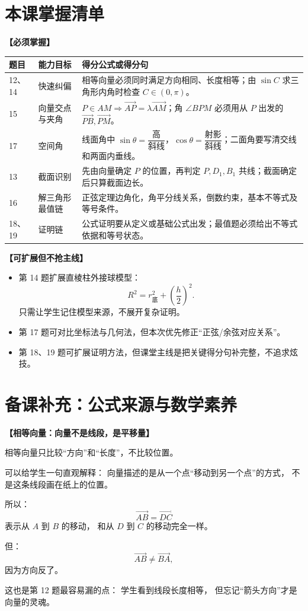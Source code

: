 \documentclass[11pt,a4paper]{ctexart}
\begin{document}
\section{本课掌握清单}

\textbf{【必须掌握】}\par
\begingroup
\small
\begin{tabularx}{\textwidth}{p{2.2cm}p{3.2cm}X}
\toprule
题目 & 能力目标 & 得分公式或得分句 \\
\midrule
12、14 & 快速纠偏 & 相等向量必须同时满足方向相同、长度相等；由 \(\sin C\) 求三角形内角时检查 \(C\in(0,\pi)\)。\\
15 & 向量交点与夹角 & \(P\in AM\Rightarrow \vec{AP}=\lambda\vec{AM}\)；角 \(\angle BPM\) 必须用从 \(P\) 出发的 \(\vec{PB},\vec{PM}\)。\\
17 & 空间角 & 线面角中 \(\sin\theta=\dfrac{\text{高}}{\text{斜线}}\)，\(\cos\theta=\dfrac{\text{射影}}{\text{斜线}}\)；二面角要写清交线和两面内垂线。\\
13 & 截面识别 & 先由向量确定 \(P\) 的位置，再判定 \(P,D_1,B_1\) 共线；截面确定后只算截面边长。\\
16 & 解三角形最值链 & 正弦定理边角化，角平分线关系，倒数约束，基本不等式及等号条件。\\
18、19 & 证明链 & 公式证明要从定义或基础公式出发；最值题必须给出不等式依据和等号状态。\\
\bottomrule
\end{tabularx}
\endgroup

\vspace{0.6em}
\textbf{【可扩展但不抢主线】}\par
\begin{itemize}[label=\(\circ\), leftmargin=1.5em, itemsep=0.2em]
  \item 第 14 题扩展直棱柱外接球模型：
  \[
    R^2=r_{\text{底}}^2+\left(\frac{h}{2}\right)^2.
  \]
  只需让学生记住模型来源，不展开复杂证明。
  \item 第 17 题可对比坐标法与几何法，但本次优先修正“正弦/余弦对应关系”。
  \item 第 18、19 题可扩展证明方法，但课堂主线是把关键得分句补完整，不追求炫技。
\end{itemize}

\section{备课补充：公式来源与数学素养}

\textbf{【相等向量：向量不是线段，是平移量】}\par
相等向量只比较“方向”和“长度”，不比较位置。\par
可以给学生一句直观解释：
向量描述的是从一个点“移动到另一个点”的方式，
不是这条线段画在纸上的位置。\par
所以：
\[
  \vec{AB}=\vec{DC}
\]
表示从 \(A\) 到 \(B\) 的移动，
和从 \(D\) 到 \(C\) 的移动完全一样。\par
但：
\[
  \vec{AB}\ne\vec{BA},
\]
因为方向反了。\par
这也是第 12 题最容易漏的点：
学生看到线段长度相等，
但忘记“箭头方向”才是向量的灵魂。
\end{document}
